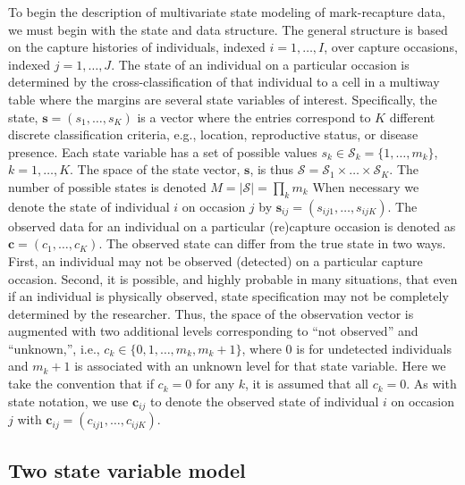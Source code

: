 \documentclass[fleqn]{article}
\newcommand{\bs}{\ensuremath{\mathbf{s}}}
\newcommand{\bc}{\ensuremath{\mathbf{c}}}
\newcommand{\fS}{\ensuremath{\mathcal{S}}}
\begin{document}
To begin the description of multivariate state modeling of mark-recapture data, we must begin with the state and data structure. The general structure is based on the capture histories of individuals, indexed $i=1,\dots,I$, over capture occasions, indexed $j=1,\dots,J$. The state of an individual on a particular occasion is determined by the cross-classification of that individual to a cell in a multiway table where the margins are several state variables of interest. Specifically, the state, $\bs = (s_1,\dots,s_K)$ is a vector where the entries correspond to $K$ different discrete classification criteria, e.g., location, reproductive status, or disease presence. Each state variable has a set of possible values $s_k \in \fS_k=\{1,\dots,m_k\}$, $k=1,\dots,K$. The space of the state vector, $\bs$, is thus $\fS = \fS_1 \times \dots \times \fS_K$. The number of possible states is denoted $M = |\fS|=\prod_k m_k$ When necessary we denote the state of individual $i$ on occasion $j$ by $\bs_{ij}=(s_{ij1},\dots,s_{ijK})$. The observed data for an individual on a particular (re)capture occasion is denoted as $\bc = (c_1,\dots,c_K)$. The observed state can differ from the true state in two ways. First, an individual may not be observed (detected) on a particular capture occasion. Second, it is possible, and highly probable in many situations, that even if an individual is physically observed, state specification may not be completely determined by the researcher. Thus, the space of the observation vector is augmented with two additional levels corresponding to ``not observed'' and ``unknown,'', i.e., $c_k \in \{0,1,\dots,m_k,m_k+1\}$, where 0 is for undetected individuals and $m_k+1$ is associated with an unknown level for that state variable. Here we take the convention that if $c_k=0$ for any $k$, it is assumed that all $c_k=0$. As with state notation, we use $\bc_{ij}$ to denote the observed state of individual $i$ on occasion $j$ with $\bc_{ij}=(c_{ij1},\dots,c_{ijK})$.


\subsection{Two state variable model}
\end{document}
